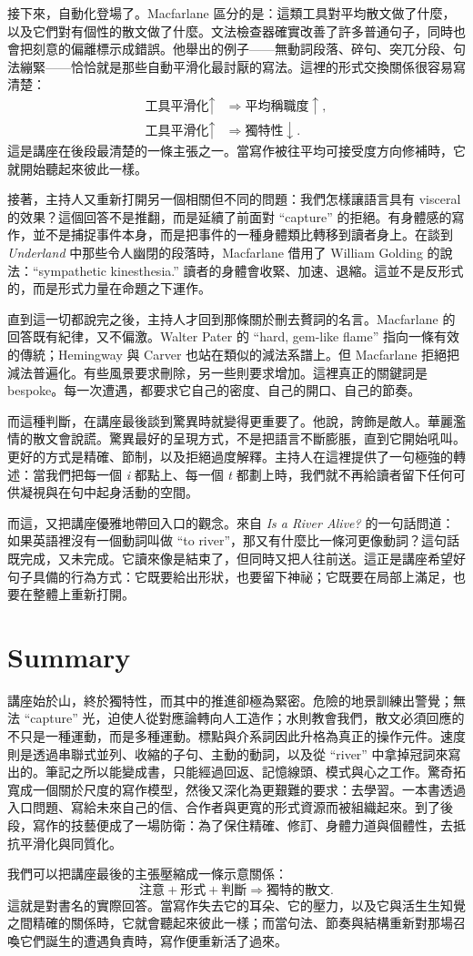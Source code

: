 接下來，自動化登場了。Macfarlane 區分的是：這類工具對平均散文做了什麼，以及它們對有個性的散文做了什麼。文法檢查器確實改善了許多普通句子，同時也會把刻意的偏離標示成錯誤。他舉出的例子——無動詞段落、碎句、突兀分段、句法繃緊——恰恰就是那些自動平滑化最討厭的寫法。這裡的形式交換關係很容易寫清楚：
\begin{align}
\text{工具平滑化} \uparrow &\Longrightarrow \text{平均稱職度} \uparrow,\\
\text{工具平滑化} \uparrow &\Longrightarrow \text{獨特性} \downarrow.
\end{align}
這是講座在後段最清楚的一條主張之一。當寫作被往平均可接受度方向修補時，它就開始聽起來彼此一樣。

接著，主持人又重新打開另一個相關但不同的問題：我們怎樣讓語言具有 visceral 的效果？這個回答不是推翻，而是延續了前面對 ``capture'' 的拒絕。有身體感的寫作，並不是捕捉事件本身，而是把事件的一種身體類比轉移到讀者身上。在談到 \emph{Underland} 中那些令人幽閉的段落時，Macfarlane 借用了 William Golding 的說法：``sympathetic kinesthesia.'' 讀者的身體會收緊、加速、退縮。這並不是反形式的，而是形式力量在命題之下運作。

直到這一切都說完之後，主持人才回到那條關於刪去贅詞的名言。Macfarlane 的回答既有紀律，又不偏激。Walter Pater 的 ``hard, gem-like flame'' 指向一條有效的傳統；Hemingway 與 Carver 也站在類似的減法系譜上。但 Macfarlane 拒絕把減法普遍化。有些風景要求刪除，另一些則要求增加。這裡真正的關鍵詞是 bespoke。每一次遭遇，都要求它自己的密度、自己的開口、自己的節奏。

而這種判斷，在講座最後談到驚異時就變得更重要了。他說，誇飾是敵人。華麗濫情的散文會說謊。驚異最好的呈現方式，不是把語言不斷膨脹，直到它開始吼叫。更好的方式是精確、節制，以及拒絕過度解釋。主持人在這裡提供了一句極強的轉述：當我們把每一個 \emph{i} 都點上、每一個 \emph{t} 都劃上時，我們就不再給讀者留下任何可供凝視與在句中起身活動的空間。

而這，又把講座優雅地帶回入口的觀念。來自 \emph{Is a River Alive?} 的一句話問道：如果英語裡沒有一個動詞叫做 ``to river''，那又有什麼比一條河更像動詞？這句話既完成，又未完成。它讀來像是結束了，但同時又把人往前送。這正是講座希望好句子具備的行為方式：它既要給出形狀，也要留下神祕；它既要在局部上滿足，也要在整體上重新打開。

\section{Summary}

講座始於山，終於獨特性，而其中的推進卻極為緊密。危險的地景訓練出警覺；無法 ``capture'' 光，迫使人從對應論轉向人工造作；水則教會我們，散文必須回應的不只是一種運動，而是多種運動。標點與介系詞因此升格為真正的操作元件。速度則是透過串聯式並列、收縮的子句、主動的動詞，以及從 ``river'' 中拿掉冠詞來寫出的。筆記之所以能變成書，只能經過回返、記憶線頭、模式與心之工作。驚奇拓寬成一個關於尺度的寫作模型，然後又深化為更艱難的要求：去學習。一本書透過入口問題、寫給未來自己的信、合作者與更寬的形式資源而被組織起來。到了後段，寫作的技藝便成了一場防衛：為了保住精確、修訂、身體力道與個體性，去抵抗平滑化與同質化。

我們可以把講座最後的主張壓縮成一條示意關係：
\begin{equation}
\text{注意} + \text{形式} + \text{判斷} \Longrightarrow \text{獨特的散文}.
\end{equation}
這就是對書名的實際回答。當寫作失去它的耳朵、它的壓力，以及它與活生生知覺之間精確的關係時，它就會聽起來彼此一樣；而當句法、節奏與結構重新對那場召喚它們誕生的遭遇負責時，寫作便重新活了過來。